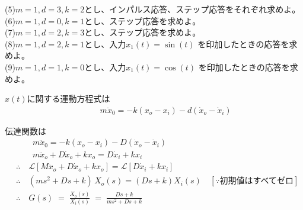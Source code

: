 \documentclass[a4paper,12pt]{article}
\begin{document}
\indent
(5)\quad \( m=1,d=3,k=2\)とし、インパルス応答、ステップ応答をそれぞれ求めよ。\\

\indent
(6)\quad \( m=1,d=0,k=1\)とし、ステップ応答を求めよ。\\

\indent
(7)\quad \( m=1,d=2,k=3\)とし、ステップ応答を求めよ。\\

\indent
(8)\quad \( m=1,d=2,k=1\)とし、入力\(x_1(t)=\sin (t)\) を印加したときの応答を求めよ。\\

\indent
(9)\quad \( m=1,d=1,k=0\)とし、入力\(x_1(t)=\cos (t)\) を印加したときの応答を求めよ。\\

\begin{tcolorbox}[title={5.(1)システムの運動方程式を求めよ。
    }]
    \(x(t)\)に関する運動方程式は
    \begin{align*}
        &\qquad m\ddot{x}_0 = -k(x_o - x_i)  - d (\dot{x}_o - \dot{x}_i)
    \end{align*}
\end{tcolorbox}
\begin{tcolorbox}[title={5.(2)システムの伝達関数を求めよ。
    }]
    伝達関数は
    \begin{align*}
        &\qquad m\ddot{x}_0 = -k(x_o - x_i)  - D (\dot{x}_o - \dot{x}_i) \\
        &\qquad m\ddot{x}_o + D \dot{x}_o + kx_o =  D \dot{x}_i + kx_i \\
        &\therefore \quad \mathcal{L} \left[ M\ddot{x}_o + D \dot{x}_o + kx_o \right] 
        =\mathcal{L} \left[ D \dot{x}_i + kx_i \right] \\
        &\therefore \quad (m s^2 + D s + k)\,X_o(s) =(D s + k)X_i(s) \quad [\because \text{初期値はすべてゼロ}]\\
        &\therefore \quad G(s) \;=\;\frac{X_o(s)}{X_i(s)}
        \;=\;\frac{D s + k}{m s^2 + D s + k}
    \end{align*}
\end{tcolorbox}
\end{document}
